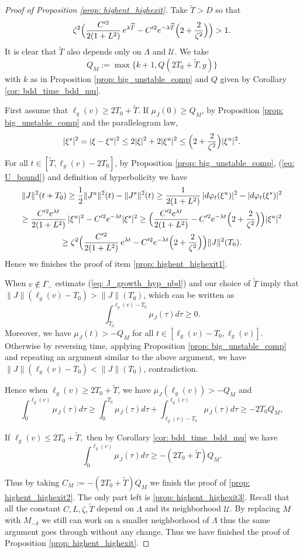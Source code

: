 \documentclass[10pt]{amsart}
\newcommand{\elg}{\ell_g}
\theoremstyle{definition}
\let\phi\varphi
\renewcommand{\>}{{\rangle}}
\newcommand{\<}{{\langle}}
\begin{document}
\begin{proof}[Proof of Proposition \ref{prop: highent_highexit}]
Take $\widetilde{T}>D$ so that
\[
\zeta^2\Bigl( \frac{C'^2}{2(1+L^2)}\,e^{\lambda \widetilde{T}}-C'^2e^{-\lambda \widetilde{T}}\Bigl(2+\frac{2}{\zeta^2}\Bigr) \Bigr)>1.
\]
It is clear that $\widetilde{T}$ also depends only on $\Lambda$ and $\mathcal{U}$. We take
\[
Q_M:=\max\{k+1, Q(2T_0+\widetilde{T},g)\}
\]
with $k$ as in Proposition \ref{prop: big_unstable_comp} and $Q$ given by Corollary \ref{cor: bdd_time_bdd_mu}.

First assume that $\elg(v)\geq 2T_0+\widetilde{T}$. If $\mu_J(0)\geq Q_M$, by Proposition \ref{prop: big_unstable_comp} and the parallelogram law,
\[
|\xi^s|^2=|\xi-\xi^u|^2\leq 2|\xi|^2+2|\xi^u|^2\leq \Bigl(2+\frac{2}{\zeta^2}\Bigr)|\xi^u|^2.
\]
For all $t\in [\widetilde{T},\elg(v)-2T_0]$, by Proposition \ref{prop: big_unstable_comp}, (\ref{eq: U_bound}) and definition of hyperbolicity we have
\begin{multline}\label{eq: J_growth_hyp_nbd}
\|J\|^2(t+T_0)\geq \frac{1}{2}\|J^u\|^2(t)-\|J^s\|^2(t) \geq \frac{1}{2(1+L^2)}\,|d\phi_t(\xi^u)|^2-|d\phi_t(\xi^s)|^2\\
\geq\frac{C'^2e^{\lambda t}}{2(1+L^2)}\,|\xi^u|^2-C'^2e^{-\lambda t}|\xi^s|^2\geq \Bigl( \frac{C'^2e^{\lambda t}}{2(1+L^2)}-C'^2e^{-\lambda t}\Bigl(2+\frac{2}{\zeta^2}\Bigr) \Bigr) |\xi^u|^2\\
\geq \zeta^2\Bigl( \frac{C'^2}{2(1+L^2)}\,e^{\lambda t}-C'^2e^{-\lambda t}\Bigl(2+\frac{2}{\zeta^2}\Bigr) \Bigr) \|J\|^2(T_0).
\end{multline}
Hence we finishes the proof of item \eqref{prop: highent_highexit1}.

When $v\notin\Gamma_-$ estimate (\ref{eq: J_growth_hyp_nbd}) and our choice of $\widetilde{T}$ imply that $\|J\|(\elg(v)-T_0)>\|J\|(T_0)$, which can be written as
\[
\int_{T_0}^{\elg(v)-T_0}\mu_J(\tau)d\tau\geq 0.
\]
Moreover, we have $\mu_{J}(t)>-Q_M$ for all $t\in[\elg(v)-T_0, \elg(v)]$. Otherwise by reversing time, applying Proposition \ref{prop: big_unstable_comp} and repeating an argument similar to the above argument, we have $\|J\|(\elg(v)-T_0)<\|J\|(T_0)$, contradiction.

Hence when $\elg(v)\geq 2T_0+\widetilde{T}$, we have $\mu_J(\elg(v))>-Q_M$ and
\[
\int_0^{\elg(v)} \mu_J(\tau)d\tau \geq \int_0^{T_0} \mu_J(\tau)d\tau+\int_{\elg(v)-T_0}^{\elg(v)} \mu_J(\tau)d\tau\geq -2T_0 Q_M,
\]

If $\elg(v)\leq 2T_0+\widetilde{T},$ then by Corollary \ref{cor: bdd_time_bdd_mu} we have
\[
\int_0^{\elg(v)} \mu_J(\tau)d\tau \geq -(2T_0+\widetilde{T}) Q_M.
\]

Thus by taking $C_M:=-(2T_0+\widetilde{T}) Q_M$ we finish the proof of \eqref{prop: highent_highexit2}. The only part left is \eqref{prop: highent_highexit3}. Recall that all the constant $C, L, \zeta, \widetilde{T}$ depend on $\Lambda$ and its neighborhood $\mathcal U$. By replacing $M$ with $M_{-\delta}$ we still can work on a smaller neighborhood of $\Lambda$ thus the same argument goes through without any change. Thus we have finished the proof of Proposition \ref{prop: highent_highexit}.
\end{proof}
\end{document}
